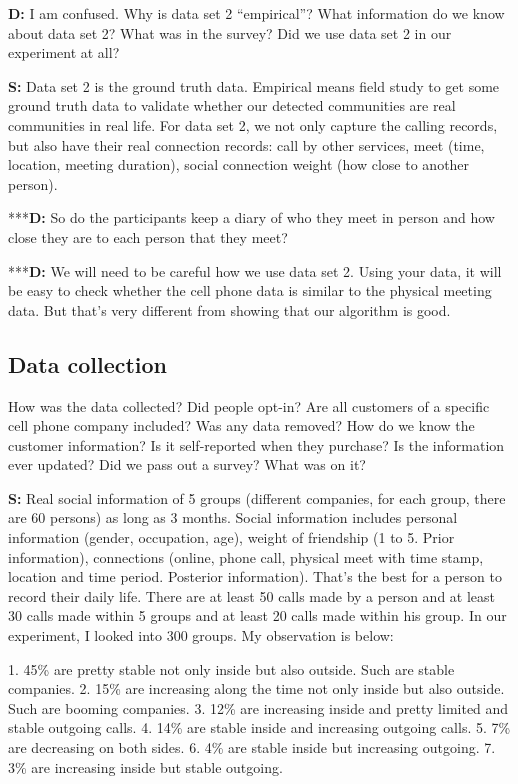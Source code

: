 \documentclass{article}
\begin{document}
\textbf{D:} I am confused. Why is data set 2 ``empirical''? What information do we know about data set 2? What was in the survey? Did we use data set 2 in our experiment at all?

\textbf{S:} Data set 2 is the ground truth data. Empirical means field study to get some ground truth data to validate whether our detected communities are real communities in real life. For data set 2, we not only capture the calling records, but also have their real connection records: call by other services, meet (time, location, meeting duration), social connection weight (how close to another person).

***\textbf{D:} So do the participants keep a diary of who they meet in person and how close they are to each person that they meet?

***\textbf{D:} We will need to be careful how we use data set 2. Using your data, it will be easy to check whether the cell phone data is similar to the physical meeting data. But that's very different from showing that our algorithm is good. 

\subsection{Data collection}

How was the data collected? Did people opt-in? Are all customers of a specific cell phone company included? Was any data removed? How do we know the customer information? Is it self-reported when they purchase? Is the information ever updated? Did we pass out a survey? What was on it?

\textbf{S:} Real social information of 5 groups (different companies, for each group, there are 60 persons) as long as 3 months. Social information includes personal information (gender, occupation, age), weight of friendship (1 to 5. Prior information), connections (online, phone call, physical meet with time stamp, location and time period. Posterior information). That's the best for a person to record their daily life. There are at least 50 calls made by a person and at least 30 calls made within 5 groups and at least 20 calls made within his group. In our experiment, I looked into 300 groups. My observation is below:

1. 45\% are pretty stable not only inside but also outside. Such are stable companies.
2. 15\% are increasing along the time not only inside but also outside. Such are booming companies.
3. 12\% are increasing inside and pretty limited and stable outgoing calls.
4. 14\% are stable inside and increasing outgoing calls.
5. 7\% are decreasing on both sides. 
6. 4\% are stable inside but increasing outgoing. 
7. 3\% are increasing inside but stable outgoing.
\end{document}
